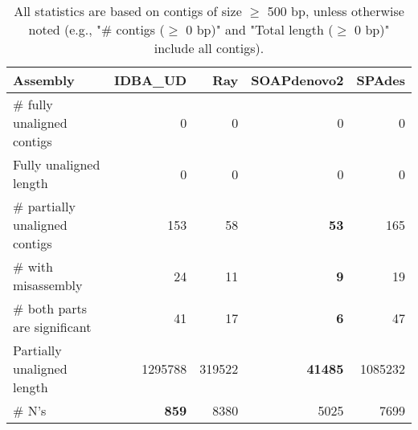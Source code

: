 \documentclass[12pt,a4paper]{article}
\begin{document}
\begin{table}[ht]
\begin{center}
\caption{All statistics are based on contigs of size $\geq$ 500 bp, unless otherwise noted (e.g., "\# contigs ($\geq$ 0 bp)" and "Total length ($\geq$ 0 bp)" include all contigs).}
\begin{tabular}{|l*{4}{|r}|}
\hline
Assembly & IDBA\_UD & Ray & SOAPdenovo2 & SPAdes \\ \hline
\# fully unaligned contigs & 0 & 0 & 0 & 0 \\ \hline
Fully unaligned length & 0 & 0 & 0 & 0 \\ \hline
\# partially unaligned contigs & 153 & 58 & {\bf 53} & 165 \\ \hline
\hspace{5mm}\# with misassembly & 24 & 11 & {\bf 9} & 19 \\ \hline
\hspace{5mm}\# both parts are significant & 41 & 17 & {\bf 6} & 47 \\ \hline
Partially unaligned length & 1295788 & 319522 & {\bf 41485} & 1085232 \\ \hline
\# N's & {\bf 859} & 8380 & 5025 & 7699 \\ \hline
\end{tabular}
\end{center}
\end{table}
\end{document}
